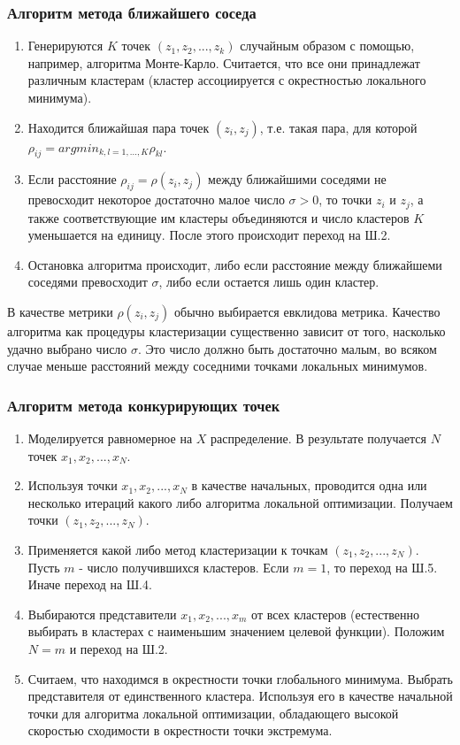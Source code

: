\documentclass[a4paper, 12pt]{article}   	%
\begin{document}
    \subsubsection{Алгоритм метода ближайшего соседа}
    \begin{enumerate}
        \item Генерируются $K$ точек $(z_1, z_2,..., z_k)$ случайным образом с помощью, например, алгоритма  Монте-Карло. Считается, что все они принадлежат различным кластерам (кластер ассоциируется с окрестностью локального минимума).
        \item Находится ближайшая пара точек $(z_i, z_j)$, т.е. такая пара, для которой $\rho_{ij} = arg min_{k, l = 1,...,K} \rho_{kl}$.
        \item Если расстояние $\rho_{ij} = \rho(z_i, z_j)$ между ближайшими соседями не превосходит некоторое достаточно малое число $\sigma > 0$, то точки $z_i$ и $z_j$, а также соответствующие им кластеры объединяются и число кластеров $K$ уменьшается на единицу. После этого происходит переход на Ш.2.
        \item Остановка алгоритма происходит, либо если расстояние между ближайшеми соседями превосходит $\sigma$, либо если остается лишь один кластер.
        \end{enumerate}
    В качестве метрики $\rho(z_i, z_j)$ обычно выбирается евклидова метрика. Качество алгоритма как процедуры кластеризации существенно зависит от того, насколько  удачно выбрано число $\sigma$. Это число должно быть достаточно малым, во всяком случае меньше расстояний между соседними точками локальных минимумов.
    
    \subsubsection{Алгоритм метода конкурирующих точек}
    \begin{enumerate}
        \item Моделируется равномерное на $X$ распределение. В результате получается $N$ точек ${x_1, x_2,..., x_N}$.
        \item Используя точки ${x_1, x_2,..., x_N}$ в качестве начальных, проводится одна или несколько итераций какого либо алгоритма локальной оптимизации. Получаем точки $(z_1, z_2,..., z_N)$.
        \item Применяется какой либо метод кластеризации к точкам  $(z_1, z_2,..., z_N)$. Пусть $m$ - число получившихся кластеров. Если $m=1$, то переход на Ш.5. Иначе переход на Ш.4.
        \item Выбираются представители $x_1, x_2,..., x_m$  от всех кластеров (естественно выбирать в кластерах с наименьшим значением целевой функции). Положим $N=m$ и переход на Ш.2.
        \item Считаем, что находимся в окрестности точки глобального минимума. Выбрать представителя от единственного кластера. Используя его в качестве начальной точки для алгоритма локальной оптимизации, обладающего высокой скоростью сходимости в окрестности точки экстремума.

    \end{enumerate}
    
\end{document}
